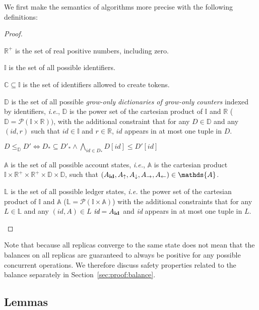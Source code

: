 \documentclass[9pt, oneside]{article}   	%
\begin{document}
We first make the semantics of algorithms more precise with the following definitions:
\begin{proof}
	\begin{pfenum}
		\item $\mathds{R}^+$ is the set of real positive numbers, including zero.
		\item $\mathds{I}$ is the set of all possible identifiers.
		\item $\mathds{C} \subseteq \mathds{I}$ is the set of identifiers allowed to create tokens.
		\item $\mathds{D}$ is the set of all possible \textit{grow-only dictionaries of grow-only counters} indexed by identifiers, \textit{i.e.}, $\mathds{D}$ is the power set of the cartesian product of $\mathds{I}$ and $\mathds{R}$ ($\mathds{D} = \mathcal{P}(\mathds{I} \times \mathds{R}))$, with the additional constraint that for any $D \in \mathds{D}$ and any $(\textit{id},r)$ such that $\textit{id} \in \mathds{I}$ and $r \in \mathds{R}$, $id$ appears in at most one tuple in $D$.
		\item $D \leq_\mathds{D} D' \Leftrightarrow D_* \subseteq D'_* \wedge \bigwedge\limits_{id \in D_*} D[id] \leq D'[id] $
		\item $\mathds{A}$ is the set of all possible account states, \textit{i.e.}, $\mathds{A}$ is the cartesian product $\mathds{I} \times \mathds{R}^+ \times \mathds{R}^+ \times \mathds{D} \times \mathds{D}$, such that $(A_{\footnotesize \textbf{id}}, A_\uparrow, A_\downarrow, A_\rightarrow, A_\leftarrow) \in \mathds{A}$. 
		\item $\mathds{L}$ is the set of all possible ledger states, \textit{i.e.} the power set of the cartesian product of $\mathds{I}$ and $\mathds{A}$ ($\mathds{L} = \mathcal{P}(\mathds{I} \times \mathds{A})$) with the additional constraints that for any $L \in \mathds{L}$ and any $(\textit{id}, A) \in L$ $\textit{id} = A_{\footnotesize \textbf{id}}$ and \textit{id} appears in at most one tuple in $L$.
	\end{pfenum}
\end{proof}

Note that because all replicas converge to the same state does not mean that the balances on all replicas are guaranteed to always be positive for any possible concurrent operations. We therefore discuss safety properties related to the balance separately in Section~\ref{sec:proof:balance}.

\subsection{Lemmas}
\end{document}
